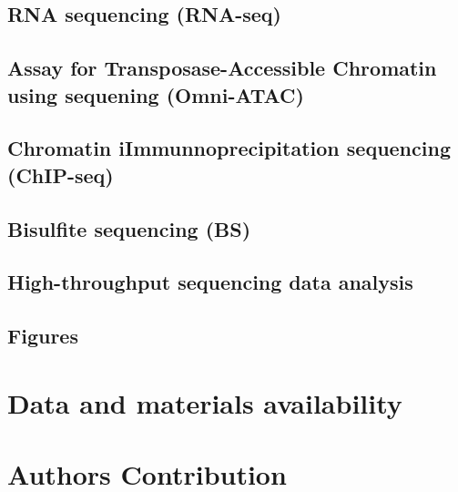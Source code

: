 \documentclass[12pt,twoside]{reedthesis}
\begin{document}
\hypertarget{rna-sequencing-rna-seq}{%
\subsection{RNA sequencing (RNA-seq)}\label{rna-sequencing-rna-seq}}

\hypertarget{assay-for-transposase-accessible-chromatin-using-sequening-omni-atac}{%
\subsection{Assay for Transposase-Accessible Chromatin using sequening (Omni-ATAC)}\label{assay-for-transposase-accessible-chromatin-using-sequening-omni-atac}}

\hypertarget{chromatin-iimmunnoprecipitation-sequencing-chip-seq}{%
\subsection{Chromatin iImmunnoprecipitation sequencing (ChIP-seq)}\label{chromatin-iimmunnoprecipitation-sequencing-chip-seq}}

\hypertarget{bisulfite-sequencing-bs}{%
\subsection{Bisulfite sequencing (BS)}\label{bisulfite-sequencing-bs}}

\hypertarget{high-throughput-sequencing-data-analysis}{%
\subsection{High-throughput sequencing data analysis}\label{high-throughput-sequencing-data-analysis}}

\hypertarget{figures}{%
\subsection{Figures}\label{figures}}

\newpage

\hypertarget{data-and-materials-availability}{%
\section{Data and materials availability}\label{data-and-materials-availability}}

\hypertarget{authors-contribution}{%
\section{Authors Contribution}\label{authors-contribution}}
\end{document}
